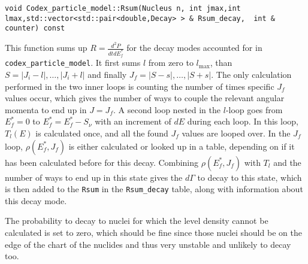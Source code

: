 \begin{lstlisting}
void Codex_particle_model::Rsum(Nucleus n, int jmax,int lmax,std::vector<std::pair<double,Decay> > & Rsum_decay,  int & counter) const
\end{lstlisting}
This function sums up $R=\frac{d^2 P}{dt dE_f^*}$ for the decay modes accounted for in \texttt{codex\_particle\_model}.
It first sums $l$ from zero to $l_\text{max}$, than $S=|J_i-l|,\dots , |J_i+l|$ and finally $J_f =|S-s|,\dots , |S+s|$. The only calculation performed in the two inner loops is counting the number of times specific $J_f$ values occur, which gives the number of ways to couple the relevant angular momenta to end up in $J=J_f$.
A second loop nested in the $l$-loop goes from $E_f^*=0$ to $E_f^* = E_f^* - S_\nu$ with an increment of $dE$ during each loop. In this loop, $T_l(E)$ is calculated once, and all the found $J_f$ values are looped over. In the $J_f$ loop, $\rho(E_f^*,J_f)$ is either calculated or looked up in a table, depending on if it has been calculated before for this decay. Combining $\rho(E_f^*,J_f)$ with $T_l$ and the number of ways to end up in this state gives the $d\Gamma$ to decay to this state, which is then added to the \texttt{Rsum} in the \texttt{Rsum\_decay} table, along with information about this decay mode.

The probability to decay to nuclei for which the level density cannot be calculated is set to zero, which should be fine since those nuclei should be on the edge of the chart of the nuclides and thus very unstable and unlikely to decay too.
